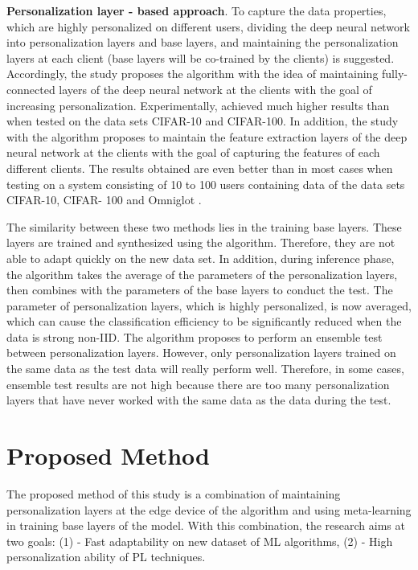\documentclass[runningheads]{llncs}
\begin{document}
\textbf{Personalization layer - based approach}. To capture the data properties, which are highly personalized on different users, dividing the deep neural network into personalization layers and base layers, and maintaining the personalization layers at each client (base layers will be co-trained by the clients) is suggested. Accordingly, the study \cite{arivazhagan2019federated} proposes the  algorithm with the idea of maintaining fully-connected layers of the deep neural network at the clients with the goal of increasing personalization. Experimentally,  achieved much higher results than  when tested on the data sets CIFAR-10 and CIFAR-100. In addition, the study \cite{liang2020think} with the algorithm  proposes to maintain the feature extraction layers of the deep neural network at the clients with the goal of capturing the features of each different clients. The results obtained are even better than  in most cases when testing on a system consisting of 10 to 100 users containing data of the data sets CIFAR-10, CIFAR- 100 and Omniglot \cite{lake2015human}.

The similarity between these two methods lies in the training base layers. These layers are trained and synthesized using the  algorithm. Therefore, they are not able to adapt quickly on the new data set. In addition, during inference phase, the  algorithm takes the average of the parameters of the personalization layers, then combines with the parameters of the base layers to conduct the test. The parameter of personalization layers, which is highly personalized, is now averaged, which can cause the classification efficiency to be significantly reduced when the data is strong non-IID. The algorithm  proposes to perform an ensemble test between personalization layers. However, only personalization layers trained on the same data as the test data will really perform well. Therefore, in some cases, ensemble test results are not high because there are too many personalization layers that have never worked with the same data as the data during the test.

\section{Proposed Method}

The proposed method of this study is a combination of maintaining personalization layers at the edge device of the algorithm  and using meta-learning in training base layers of the model. With this combination, the research aims at two goals: (1) - Fast adaptability on new dataset of ML algorithms, (2) - High personalization ability of PL techniques.
\end{document}

